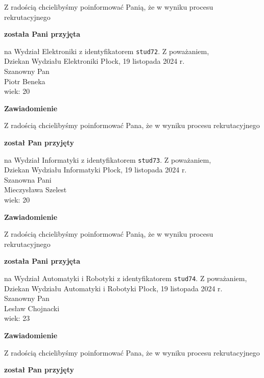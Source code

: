 \documentclass[12pt,a4paper]{article}
\begin{document}
\bigskip 
Z radością chcielibyśmy poinformować Panią, że w wyniku procesu rekrutacyjnego
\begin{center}
\textsf{\textbf{została Pani przyjęta}}
\end{center}
na Wydział Elektroniki z identyfikatorem \verb|stud72|. 
\vspace{2cm}
\noindent
Z poważaniem, \\
Dziekan
Wydziału Elektroniki
\newpage
\hfill Płock, 19 listopada 2024 r. \\
\noindent
Szanowny Pan \\
Piotr Beneka \\
wiek: 20
\bigskip
\begin{center}
    {\Large\textbf{Zawiadomienie}}
\end{center}
\bigskip 
Z radością chcielibyśmy poinformować Pana, że w wyniku procesu rekrutacyjnego
\begin{center}
\textsf{\textbf{został Pan przyjęty}}
\end{center}
na Wydział Informatyki z identyfikatorem \verb|stud73|. 
\vspace{2cm}
\noindent
Z poważaniem, \\
Dziekan
Wydziału Informatyki
\newpage
\hfill Płock, 19 listopada 2024 r. \\
\noindent
Szanowna Pani \\
Mieczysława Szelest \\
wiek: 20
\bigskip
\begin{center}
    {\Large\textbf{Zawiadomienie}}
\end{center}
\bigskip 
Z radością chcielibyśmy poinformować Panią, że w wyniku procesu rekrutacyjnego
\begin{center}
\textsf{\textbf{została Pani przyjęta}}
\end{center}
na Wydział Automatyki i Robotyki z identyfikatorem \verb|stud74|. 
\vspace{2cm}
\noindent
Z poważaniem, \\
Dziekan
Wydziału Automatyki i Robotyki
\newpage
\hfill Płock, 19 listopada 2024 r. \\
\noindent
Szanowny Pan \\
Lesław Chojnacki \\
wiek: 23
\bigskip
\begin{center}
    {\Large\textbf{Zawiadomienie}}
\end{center}
\bigskip 
Z radością chcielibyśmy poinformować Pana, że w wyniku procesu rekrutacyjnego
\begin{center}
\textsf{\textbf{został Pan przyjęty}}
\end{center}
\end{document}
